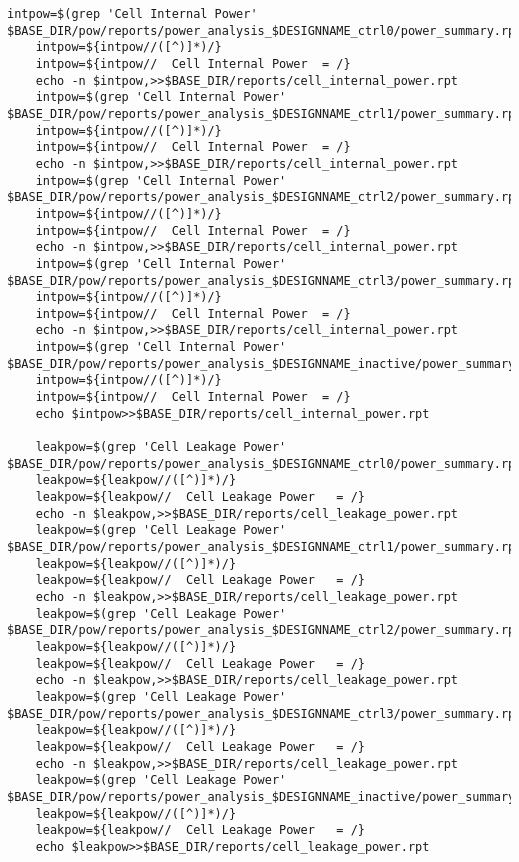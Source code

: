 \begin{lstlisting}[caption={HLS Script source code},label=lst:hlsscriptsourcecode]
	intpow=$(grep 'Cell Internal Power' $BASE_DIR/pow/reports/power_analysis_$DESIGNNAME_ctrl0/power_summary.rpt)
	intpow=${intpow//([^)]*)/}
	intpow=${intpow//  Cell Internal Power  = /}
	echo -n $intpow,>>$BASE_DIR/reports/cell_internal_power.rpt
	intpow=$(grep 'Cell Internal Power' $BASE_DIR/pow/reports/power_analysis_$DESIGNNAME_ctrl1/power_summary.rpt)
	intpow=${intpow//([^)]*)/}
	intpow=${intpow//  Cell Internal Power  = /}
	echo -n $intpow,>>$BASE_DIR/reports/cell_internal_power.rpt
	intpow=$(grep 'Cell Internal Power' $BASE_DIR/pow/reports/power_analysis_$DESIGNNAME_ctrl2/power_summary.rpt)
	intpow=${intpow//([^)]*)/}
	intpow=${intpow//  Cell Internal Power  = /}
	echo -n $intpow,>>$BASE_DIR/reports/cell_internal_power.rpt
	intpow=$(grep 'Cell Internal Power' $BASE_DIR/pow/reports/power_analysis_$DESIGNNAME_ctrl3/power_summary.rpt)
	intpow=${intpow//([^)]*)/}
	intpow=${intpow//  Cell Internal Power  = /}
	echo -n $intpow,>>$BASE_DIR/reports/cell_internal_power.rpt
	intpow=$(grep 'Cell Internal Power' $BASE_DIR/pow/reports/power_analysis_$DESIGNNAME_inactive/power_summary.rpt)
	intpow=${intpow//([^)]*)/}
	intpow=${intpow//  Cell Internal Power  = /}
	echo $intpow>>$BASE_DIR/reports/cell_internal_power.rpt

	leakpow=$(grep 'Cell Leakage Power' $BASE_DIR/pow/reports/power_analysis_$DESIGNNAME_ctrl0/power_summary.rpt)
	leakpow=${leakpow//([^)]*)/}
	leakpow=${leakpow//  Cell Leakage Power   = /}
	echo -n $leakpow,>>$BASE_DIR/reports/cell_leakage_power.rpt
	leakpow=$(grep 'Cell Leakage Power' $BASE_DIR/pow/reports/power_analysis_$DESIGNNAME_ctrl1/power_summary.rpt)
	leakpow=${leakpow//([^)]*)/}
	leakpow=${leakpow//  Cell Leakage Power   = /}
	echo -n $leakpow,>>$BASE_DIR/reports/cell_leakage_power.rpt
	leakpow=$(grep 'Cell Leakage Power' $BASE_DIR/pow/reports/power_analysis_$DESIGNNAME_ctrl2/power_summary.rpt)
	leakpow=${leakpow//([^)]*)/}
	leakpow=${leakpow//  Cell Leakage Power   = /}
	echo -n $leakpow,>>$BASE_DIR/reports/cell_leakage_power.rpt
	leakpow=$(grep 'Cell Leakage Power' $BASE_DIR/pow/reports/power_analysis_$DESIGNNAME_ctrl3/power_summary.rpt)
	leakpow=${leakpow//([^)]*)/}
	leakpow=${leakpow//  Cell Leakage Power   = /}
	echo -n $leakpow,>>$BASE_DIR/reports/cell_leakage_power.rpt
	leakpow=$(grep 'Cell Leakage Power' $BASE_DIR/pow/reports/power_analysis_$DESIGNNAME_inactive/power_summary.rpt)
	leakpow=${leakpow//([^)]*)/}
	leakpow=${leakpow//  Cell Leakage Power   = /}
	echo $leakpow>>$BASE_DIR/reports/cell_leakage_power.rpt


\end{lstlisting}
